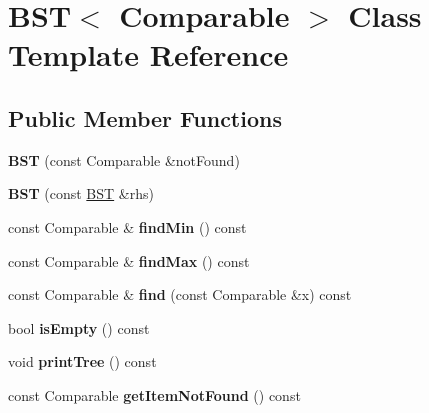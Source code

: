 \hypertarget{class_b_s_t}{}\section{B\+ST$<$ Comparable $>$ Class Template Reference}
\label{class_b_s_t}
\subsection*{Public Member Functions}
\begin{DoxyCompactItemize}
\item 
{\bfseries B\+ST} (const Comparable \&not\+Found)\hypertarget{class_b_s_t_a3185a79cf472271f122a97d0f59022d1}{}\label{class_b_s_t_a3185a79cf472271f122a97d0f59022d1}

\item 
{\bfseries B\+ST} (const \hyperlink{class_b_s_t}{B\+ST} \&rhs)\hypertarget{class_b_s_t_a163232cc6ffcbd1a51707efcc3fa36ca}{}\label{class_b_s_t_a163232cc6ffcbd1a51707efcc3fa36ca}

\item 
const Comparable \& {\bfseries find\+Min} () const \hypertarget{class_b_s_t_a34fd17be76f49a77573185f29dede6be}{}\label{class_b_s_t_a34fd17be76f49a77573185f29dede6be}

\item 
const Comparable \& {\bfseries find\+Max} () const \hypertarget{class_b_s_t_aee725fe273c0b3641070883b50eee271}{}\label{class_b_s_t_aee725fe273c0b3641070883b50eee271}

\item 
const Comparable \& {\bfseries find} (const Comparable \&x) const \hypertarget{class_b_s_t_a337dce7f94a881e253635cbf3ac7eacf}{}\label{class_b_s_t_a337dce7f94a881e253635cbf3ac7eacf}

\item 
bool {\bfseries is\+Empty} () const \hypertarget{class_b_s_t_a8018fc7d6c15b2564c10ddcc4316c64d}{}\label{class_b_s_t_a8018fc7d6c15b2564c10ddcc4316c64d}

\item 
void {\bfseries print\+Tree} () const \hypertarget{class_b_s_t_a5270473db9e17e1737b92dd0d6cd0ee5}{}\label{class_b_s_t_a5270473db9e17e1737b92dd0d6cd0ee5}

\item 
const Comparable {\bfseries get\+Item\+Not\+Found} () const \hypertarget{class_b_s_t_aef52495563ad16b2560e688406f0d2e3}{}\label{class_b_s_t_aef52495563ad16b2560e688406f0d2e3}


\end{DoxyCompactItemize}
